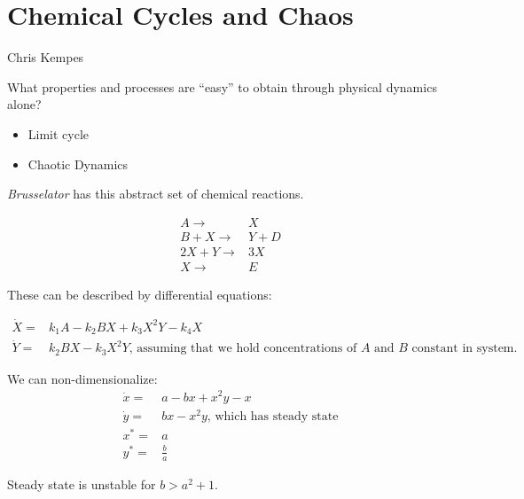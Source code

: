 \documentclass[]{article}
\begin{document}
\cite[19.S, Nucleic Acids (Summary)]{brown2009chemistry}
\section{Chemical Cycles and Chaos}

Chris Kempes

What properties and processes are “easy” to obtain
through physical dynamics alone?
\begin{itemize}
	\item Limit cycle
	\item Chaotic Dynamics
\end{itemize}


\textit{Brusselator} has this abstract set of chemical reactions.

\begin{align*}
A \rightarrow& X\\
B + X \rightarrow& Y + D\\
2X + Y \rightarrow& 3X \\
X \rightarrow& E
\end{align*}

These can be described by differential equations:

\begin{align*}
\dot X =& k_1 A - k_2 B X + k_3 X^2 Y -k_4 X\\
\dot Y =& k_2 B X -k_3 X^2 Y\text{, assuming that we hold concentrations of $A$ and $B$ constant in system.}  
\end{align*}

We can non-dimensionalize:
\begin{align*}
\dot x =& a - b x +x^2 y -x\\
\dot y =& bx - x^2 y\text{, which has steady state}\\
x^* =& a\\
y^* =& \frac{b}{a}
\end{align*}

Steady state is unstable for $b>a^2+1$. 
\end{document}
